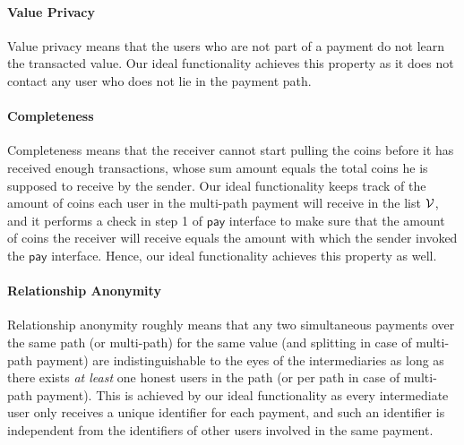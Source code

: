 
\paragraph{Value Privacy}
Value privacy means that the users who are not part of a payment do not learn the transacted 
value. Our ideal functionality achieves this property as it does not contact any user who does 
not lie in the payment path. 


\paragraph{Completeness}
Completeness means that the receiver cannot start pulling the coins before it has received 
enough transactions, whose sum amount equals the total coins he is supposed to receive by 
the sender. Our ideal functionality keeps track of the amount of coins each user in the 
multi-path payment will receive in the list $\mathcal{V}$, and it performs a check in step 1 of 
$\mathsf{pay}$ interface to make sure that the amount of coins the receiver will receive equals 
the amount with which the sender invoked the $\mathsf{pay}$ interface. Hence, our ideal 
functionality achieves this property as well.

\paragraph{Relationship Anonymity}
Relationship anonymity roughly means that any two simultaneous payments over the same path (or 
multi-path) for the same value (and splitting in case of multi-path payment) are 
indistinguishable to the eyes of the intermediaries as long as there exists \emph{at least} 
one honest users in the path (or per path in case of multi-path payment). This is achieved by 
our ideal functionality as every intermediate user only receives a unique identifier for 
each payment, and such an identifier is independent from the identifiers of other users involved 
in the same payment.

